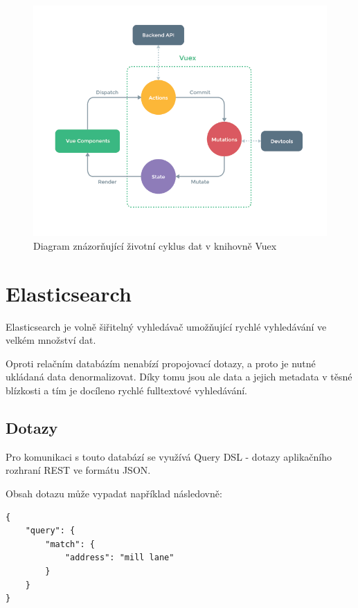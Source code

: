 \begin{figure}[H]
	\centering
	\includegraphics[width=\textwidth]{images/vuex.png}
	\caption{Diagram znázorňující životní cyklus dat v knihovně Vuex}
	\label{vuex-dataflow}
\end{figure}

\blindtext

\section{Elasticsearch}
Elasticsearch je volně šiřitelný vyhledávač umožňující rychlé vyhledávání ve velkém množství dat. 

Oproti relačním databázím nenabízí propojovací dotazy, a proto je nutné ukládaná data denormalizovat. Díky tomu jsou ale data a jejich metadata v těsné blízkosti a tím je docíleno rychlé fulltextové vyhledávání. %

\subsection{Dotazy}
Pro komunikaci s touto databází se využívá Query DSL - dotazy aplikačního rozhraní REST ve formátu JSON.

Obsah dotazu může vypadat například následovně:
\begin{verbatim}
{
    "query": {
        "match": {
            "address": "mill lane"
        }
    }
}
\end{verbatim}

